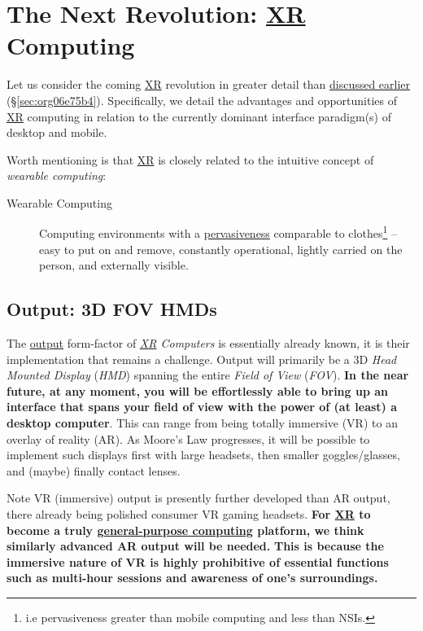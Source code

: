 \documentclass[logo,bsc,singlespacing,parskip]{infthesis}
\begin{document}
\chapter{The Next Revolution: \hyperref[org88b0f70]{XR} Computing}
\label{sec:orgaa60e10}
Let us consider the coming \hyperref[org88b0f70]{XR} revolution in greater detail than \hyperref[sec:org06e75b4]{discussed earlier} (\S \ref{sec:org06e75b4}).
Specifically, we detail the advantages and opportunities of \hyperref[org88b0f70]{XR} computing in relation to the currently dominant interface paradigm(s) of desktop and mobile.

Worth mentioning is that \hyperref[org88b0f70]{XR} is closely related to the intuitive concept of \emph{wearable computing}:

\begin{mdframed}
\begin{description}
\item[{Wearable Computing\label{wearable computing}}] Computing environments with a \hyperref[pervasiveness]{pervasiveness} comparable to clothes\footnote{i.e pervasiveness greater than mobile computing and less than NSIs.} -- easy to put on and remove, constantly operational, lightly carried on the person, and externally visible.
\end{description}
\end{mdframed}
\section{Output: 3D FOV HMDs}
\label{sec:org89a9346}
The \hyperref[output]{output} form-factor of \emph{\hyperref[org88b0f70]{XR} Computers} is essentially already known, it is their implementation that remains a challenge.
Output will primarily be a 3D \emph{Head Mounted Display} (\emph{HMD}) spanning the entire \emph{Field of View} (\emph{FOV}).
\textbf{In the near future, at any moment, you will be effortlessly able to bring up an interface that spans your field of view with the power of (at least) a desktop computer}.
This can range from being totally immersive (VR) to an overlay of reality (AR).
As Moore's Law progresses, it will be possible to implement such displays first with large headsets, then smaller goggles/glasses, and (maybe) finally contact lenses.

Note VR (immersive) output is presently further developed than AR output, there already being polished consumer VR gaming headsets.
\textbf{For \hyperref[org88b0f70]{XR} to become a truly \hyperref[orgc53ce01]{general-purpose computing} platform, we think similarly advanced AR output will be needed.}
\textbf{This is because the immersive nature of VR is highly prohibitive of essential functions such as multi-hour sessions and awareness of one's surroundings.}
\end{document}
